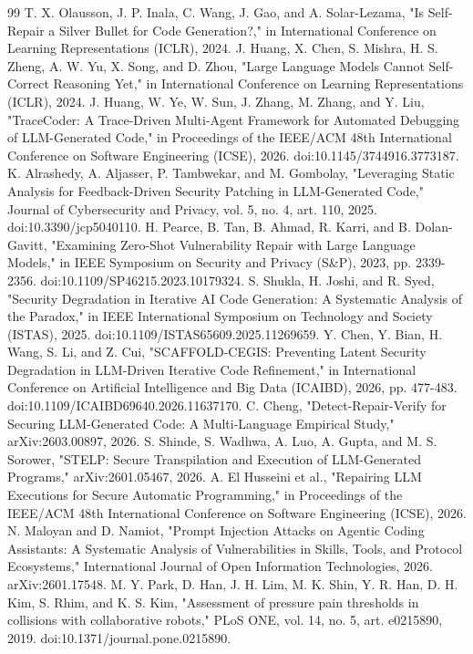 \documentclass{ieeeaccess}
\begin{document}
\begin{thebibliography}{99}
 T. X. Olausson, J. P. Inala, C. Wang, J. Gao, and A. Solar-Lezama, "Is Self-Repair a Silver Bullet for Code Generation?," in International Conference on Learning Representations (ICLR), 2024.
 J. Huang, X. Chen, S. Mishra, H. S. Zheng, A. W. Yu, X. Song, and D. Zhou, "Large Language Models Cannot Self-Correct Reasoning Yet," in International Conference on Learning Representations (ICLR), 2024.
 J. Huang, W. Ye, W. Sun, J. Zhang, M. Zhang, and Y. Liu, "TraceCoder: A Trace-Driven Multi-Agent Framework for Automated Debugging of LLM-Generated Code," in Proceedings of the IEEE/ACM 48th International Conference on Software Engineering (ICSE), 2026. doi:10.1145/3744916.3773187.
 K. Alrashedy, A. Aljasser, P. Tambwekar, and M. Gombolay, "Leveraging Static Analysis for Feedback-Driven Security Patching in LLM-Generated Code," Journal of Cybersecurity and Privacy, vol. 5, no. 4, art. 110, 2025. doi:10.3390/jcp5040110.
 H. Pearce, B. Tan, B. Ahmad, R. Karri, and B. Dolan-Gavitt, "Examining Zero-Shot Vulnerability Repair with Large Language Models," in IEEE Symposium on Security and Privacy (S\&P), 2023, pp. 2339-2356. doi:10.1109/SP46215.2023.10179324.
 S. Shukla, H. Joshi, and R. Syed, "Security Degradation in Iterative AI Code Generation: A Systematic Analysis of the Paradox," in IEEE International Symposium on Technology and Society (ISTAS), 2025. doi:10.1109/ISTAS65609.2025.11269659.
 Y. Chen, Y. Bian, H. Wang, S. Li, and Z. Cui, "SCAFFOLD-CEGIS: Preventing Latent Security Degradation in LLM-Driven Iterative Code Refinement," in International Conference on Artificial Intelligence and Big Data (ICAIBD), 2026, pp. 477-483. doi:10.1109/ICAIBD69640.2026.11637170.
 C. Cheng, "Detect-Repair-Verify for Securing LLM-Generated Code: A Multi-Language Empirical Study," arXiv:2603.00897, 2026.
 S. Shinde, S. Wadhwa, A. Luo, A. Gupta, and M. S. Sorower, "STELP: Secure Transpilation and Execution of LLM-Generated Programs," arXiv:2601.05467, 2026.
 A. El Husseini et al., "Repairing LLM Executions for Secure Automatic Programming," in Proceedings of the IEEE/ACM 48th International Conference on Software Engineering (ICSE), 2026.
 N. Maloyan and D. Namiot, "Prompt Injection Attacks on Agentic Coding Assistants: A Systematic Analysis of Vulnerabilities in Skills, Tools, and Protocol Ecosystems," International Journal of Open Information Technologies, 2026. arXiv:2601.17548.
 M. Y. Park, D. Han, J. H. Lim, M. K. Shin, Y. R. Han, D. H. Kim, S. Rhim, and K. S. Kim, "Assessment of pressure pain thresholds in collisions with collaborative robots," PLoS ONE, vol. 14, no. 5, art. e0215890, 2019. doi:10.1371/journal.pone.0215890.

\end{thebibliography}
\end{document}
